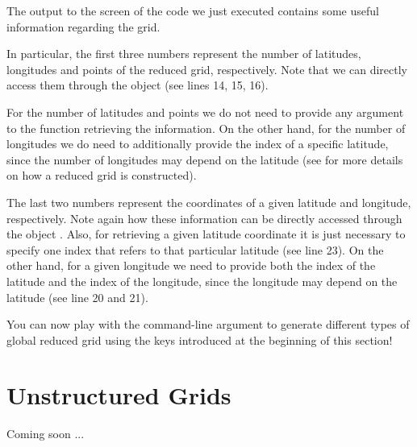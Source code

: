 The output to the screen of the code we just executed 
contains some useful information regarding the grid.

In particular, the first three numbers represent the 
number of latitudes, longitudes and points of the reduced
grid, respectively. Note that we can directly access them 
through the  object (see lines 14, 15, 16).
%
\begin{tipbox}
For the number of latitudes and points we do not need to provide
any argument to the function retrieving the information. On the 
other hand, for the number of longitudes we do need to additionally 
provide the index of a specific latitude, since the number of 
longitudes may depend on the latitude (see  
for more details on how a reduced grid is constructed). 
\end{tipbox}
%
The last two numbers represent the coordinates of a given 
latitude and longitude, respectively. Note again how these 
information can be directly accessed through the object 
. 
Also, for retrieving a given latitude coordinate it is just 
necessary to specify one index that refers to that particular 
latitude (see line 23). On the other hand, for a given longitude 
we need to provide both the index of the latitude and the index 
of the longitude, since the longitude may depend on the latitude 
(see line 20 and 21).

You can now play with the command-line argument to generate 
different types of global reduced grid using the keys introduced 
at the beginning of this section!



\section{Unstructured Grids}
Coming soon ...